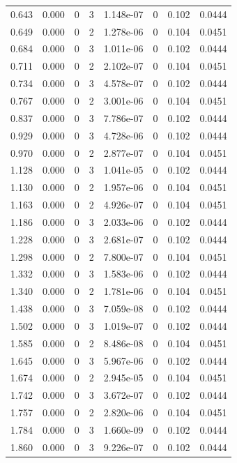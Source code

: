 \documentclass[preview]{standalone}
\begin{document}
{{\begin{tabular}{L{1.2cm}C{1.2cm} C{0.3cm}C{0.5cm} C{1.4cm}C{1.4cm} C{1.4cm}C{1.4cm}}
  0.643  &  0.000  & 0     &  3 &  1.148e-07  & 0  & 0.102 &  0.0444   \\ 
  0.649  &  0.000  & 0     &  2 &  1.278e-06  & 0  & 0.104 &  0.0451   \\ 
  0.684  &  0.000  & 0     &  3 &  1.011e-06  & 0  & 0.102 &  0.0444   \\ 
  0.711  &  0.000  & 0     &  2 &  2.102e-07  & 0  & 0.104 &  0.0451   \\ 
  0.734  &  0.000  & 0     &  3 &  4.578e-07  & 0  & 0.102 &  0.0444   \\ 
  0.767  &  0.000  & 0     &  2 &  3.001e-06  & 0  & 0.104 &  0.0451   \\ 
  0.837  &  0.000  & 0     &  3 &  7.786e-07  & 0  & 0.102 &  0.0444   \\ 
  0.929  &  0.000  & 0     &  3 &  4.728e-06  & 0  & 0.102 &  0.0444   \\ 
  0.970  &  0.000  & 0     &  2 &  2.877e-07  & 0  & 0.104 &  0.0451   \\ 
  1.128  &  0.000  & 0     &  3 &  1.041e-05  & 0  & 0.102 &  0.0444   \\ 
  1.130  &  0.000  & 0     &  2 &  1.957e-06  & 0  & 0.104 &  0.0451   \\ 
  1.163  &  0.000  & 0     &  2 &  4.926e-07  & 0  & 0.104 &  0.0451   \\ 
  1.186  &  0.000  & 0     &  3 &  2.033e-06  & 0  & 0.102 &  0.0444   \\ 
  1.228  &  0.000  & 0     &  3 &  2.681e-07  & 0  & 0.102 &  0.0444   \\ 
  1.298  &  0.000  & 0     &  2 &  7.800e-07  & 0  & 0.104 &  0.0451   \\ 
  1.332  &  0.000  & 0     &  3 &  1.583e-06  & 0  & 0.102 &  0.0444   \\ 
  1.340  &  0.000  & 0     &  2 &  1.781e-06  & 0  & 0.104 &  0.0451   \\ 
  1.438  &  0.000  & 0     &  3 &  7.059e-08  & 0  & 0.102 &  0.0444   \\ 
  1.502  &  0.000  & 0     &  3 &  1.019e-07  & 0  & 0.102 &  0.0444   \\ 
  1.585  &  0.000  & 0     &  2 &  8.486e-08  & 0  & 0.104 &  0.0451   \\ 
  1.645  &  0.000  & 0     &  3 &  5.967e-06  & 0  & 0.102 &  0.0444   \\ 
  1.674  &  0.000  & 0     &  2 &  2.945e-05  & 0  & 0.104 &  0.0451   \\ 
  1.742  &  0.000  & 0     &  3 &  3.672e-07  & 0  & 0.102 &  0.0444   \\ 
  1.757  &  0.000  & 0     &  2 &  2.820e-06  & 0  & 0.104 &  0.0451   \\ 
  1.784  &  0.000  & 0     &  3 &  1.660e-09  & 0  & 0.102 &  0.0444   \\ 
  1.860  &  0.000  & 0     &  3 &  9.226e-07  & 0  & 0.102 &  0.0444   \\ 
\hline 
\end{tabular} 

}}
\end{document}
